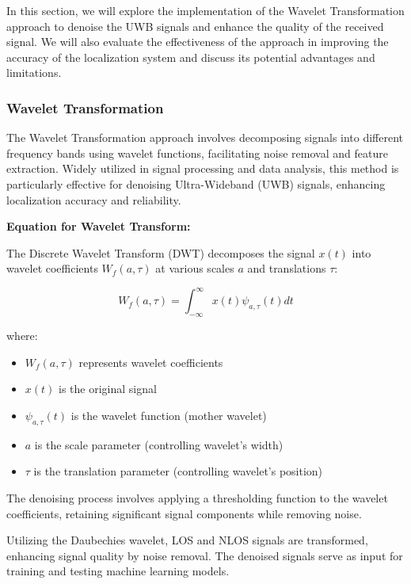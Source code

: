 In this section, we will explore the implementation of the Wavelet Transformation approach to denoise the UWB signals and enhance the quality of the received signal. We will also evaluate the effectiveness of the approach in improving the accuracy of the localization system and discuss its potential advantages and limitations.

\subsubsection{Wavelet Transformation}\label{wavelet_transformation}

The Wavelet Transformation approach involves decomposing signals into different frequency bands using wavelet functions, facilitating noise removal and feature extraction. Widely utilized in signal processing and data analysis, this method is particularly effective for denoising Ultra-Wideband (UWB) signals, enhancing localization accuracy and reliability.

\textbf{Equation for Wavelet Transform:}

The Discrete Wavelet Transform (DWT) decomposes the signal $x(t)$ into wavelet coefficients $W_f(a, \tau)$ at various scales $a$ and translations $\tau$:

\begin{equation}
W_f(a, \tau) = \int_{-\infty}^{\infty} x(t) \psi_{a, \tau}(t) dt
\end{equation}

where:

\begin{itemize}
  \item $W_f(a, \tau)$ represents wavelet coefficients
  \item $x(t)$ is the original signal
  \item $\psi_{a, \tau}(t)$ is the wavelet function (mother wavelet)
  \item $a$ is the scale parameter (controlling wavelet's width)
  \item $\tau$ is the translation parameter (controlling wavelet's position)
\end{itemize}

The denoising process involves applying a thresholding function to the wavelet coefficients, retaining significant signal components while removing noise.

Utilizing the Daubechies wavelet, LOS and NLOS signals are transformed, enhancing signal quality by noise removal. The denoised signals serve as input for training and testing machine learning models.

